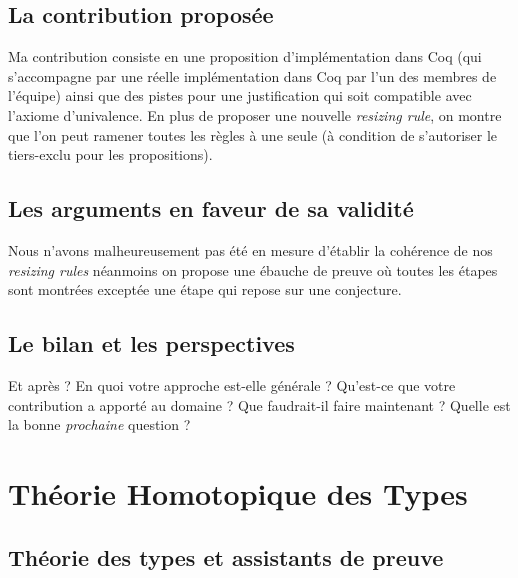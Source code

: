 \documentclass[11pt]{article}
\begin{document}
\subsection*{La contribution proposée}

Ma contribution consiste en une proposition d'implémentation dans Coq
(qui s'accompagne par une réelle implémentation dans Coq par l'un des membres
de l'équipe) ainsi que des pistes pour une justification qui soit compatible
avec l'axiome d'univalence. En plus de proposer une nouvelle \emph{resizing
rule}, on montre que l'on peut ramener toutes les règles à une seule (à
condition de s'autoriser le tiers-exclu pour les propositions).

\subsection*{Les arguments en faveur de sa validité}

Nous n'avons malheureusement pas été en mesure d'établir la cohérence de nos
\emph{resizing rules} néanmoins on propose une ébauche de preuve où toutes les
étapes sont montrées exceptée une étape qui repose sur une conjecture.

\subsection*{Le bilan et les perspectives}

Et après ? En quoi votre approche est-elle générale ?
Qu'est-ce que votre contribution a apporté au domaine ?
Que faudrait-il faire maintenant ?
Quelle est la bonne \emph{prochaine} question ?

\section{Théorie Homotopique des Types}

\subsection{Théorie des types et assistants de preuve}
\end{document}
